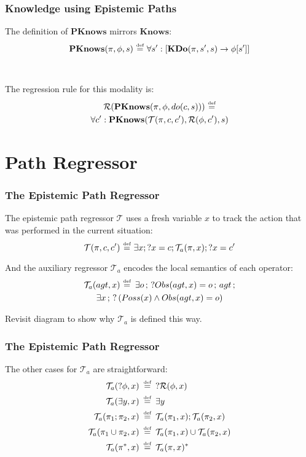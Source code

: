 \documentclass[compress]{beamer}
\newcommand{\isdef}{\hbox{$\stackrel{\mbox{\tiny def}}{=}$}}
\newcommand{\Reg}{\mathcal{R}}
\newcommand{\Trn}{\mathcal{T}}
\newcommand{\TrnA}{\Trn_{a}}
\newcommand{\Knows}{\mathbf{Knows}}
\newcommand{\PKnows}{\mathbf{PKnows}}
\newcommand{\KDo}{\mathbf{KDo}}
\begin{document}
\begin{frame}
\frametitle{Knowledge using Epistemic Paths}
The definition of $\PKnows$ mirrors $\Knows$:
\begin{equation*}
\PKnows(\pi,\phi,s)\,\,\isdef\,\,\forall s': \left[ \KDo(\pi,s',s) \rightarrow \phi[s']\right]
\end{equation*}
\ \\
\ \\
\pause
The regression rule for this modality is:
\begin{multline*}
\Reg(\PKnows(\pi,\phi,do(c,s)))\,\,\isdef \\
  \forall c': \PKnows(\Trn(\pi,c,c'),\Reg(\phi,c'),s)
\end{multline*}
\end{frame}

\section{Path Regressor}

\begin{frame}
\frametitle{The Epistemic Path Regressor}
The epistemic path regressor $\Trn$ uses a fresh variable $x$ to track the action that was performed in the current situation:
\begin{equation*}
\Trn(\pi,c,c')\,\,\isdef\,\,\exists x ; ?x=c ; \TrnA(\pi,x) ; ?x=c'
\end{equation*}

And the auxiliary regressor $\TrnA$ encodes the local semantics of each operator:
\begin{multline*}
\TrnA(agt,x) \,\,\isdef \,\,\,\exists o\,;\,?Obs(agt,x)=o\,;\,agt\,;\\
   \exists x\,;\,?\left(Poss(x)\wedge Obs(agt,x)=o\right)
\end{multline*}
\end{frame}

\begin{frame}
Revisit diagram to show why $\TrnA$ is defined this way.
\end{frame}

\begin{frame}
\frametitle{The Epistemic Path Regressor}
The other cases for $\TrnA$ are straightforward:
\begin{align*}
\TrnA(?\phi,x) & \,\,\,\isdef\,\,\,?\Reg(\phi,x) \\
\TrnA(\exists y,x) & \,\,\,\isdef\,\,\,\exists y \\
\TrnA(\pi_1 ; \pi_2,x) & \,\,\,\isdef\,\,\,\TrnA(\pi_1,x) ; \TrnA(\pi_2,x) \\
\TrnA(\pi_1 \cup \pi_2,x) & \,\,\,\isdef\,\,\,\TrnA(\pi_1,x) \cup \TrnA(\pi_2,x) \\
\TrnA(\pi^*,x) & \,\,\,\isdef\,\,\,\TrnA(\pi,x)^*
\end{align*}
\end{frame}
\end{document}

